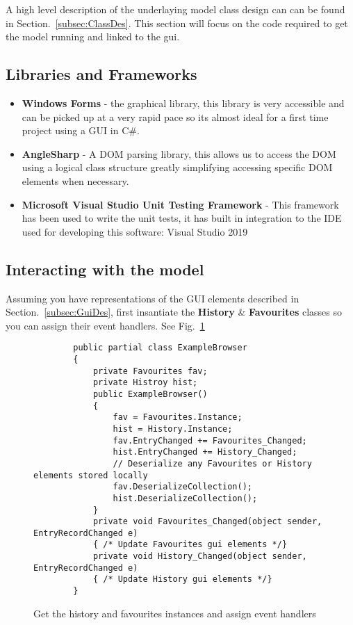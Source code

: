 \documentclass[../Main.tex]{subfiles}
\begin{document}
A high level description of the underlaying model class design can can be found in Section.~\ref{subsec:ClassDes}. This section will focus on the code required to get the model running and linked to the gui.

\subsection{Libraries and Frameworks}
\begin{itemize}
    \item \textbf{Windows Forms} - the graphical library, this library is very accessible and can be picked up at a very rapid pace so its almost ideal for a first time project using a GUI in C\#.
    \item \textbf{AngleSharp} - A DOM parsing library, this allows us to access the DOM using a logical class structure greatly simplifying accessing specific DOM elements when necessary.
    \item \textbf{Microsoft Visual Studio Unit Testing Framework} - This framework has been used to write the unit tests, it has built in integration to the IDE used for developing this software: Visual Studio 2019
\end{itemize}

\subsection{Interacting with the model}

Assuming you have representations of the GUI elements described in Section.~\ref{subsec:GuiDes}, first insantiate the \textbf{History} \& \textbf{Favourites} classes so you can assign their event handlers. See Fig.~\ref{fig:instantiateHistFav}

\begin{figure}[H]
    \begin{verbatim}
        public partial class ExampleBrowser
        {
            private Favourites fav;
            private Histroy hist;
            public ExampleBrowser()
            {
                fav = Favourites.Instance;
                hist = History.Instance;
                fav.EntryChanged += Favourites_Changed;
                hist.EntryChanged += History_Changed;
                // Deserialize any Favourites or History elements stored locally
                fav.DeserializeCollection();
                hist.DeserializeCollection();
            }
            private void Favourites_Changed(object sender, EntryRecordChanged e) 
            { /* Update Favourites gui elements */}
            private void History_Changed(object sender, EntryRecordChanged e) 
            { /* Update History gui elements */}
        }
    \end{verbatim}
    \caption{Get the history and favourites instances and assign event handlers}
    \label{fig:instantiateHistFav}
\end{figure}
\end{document}

